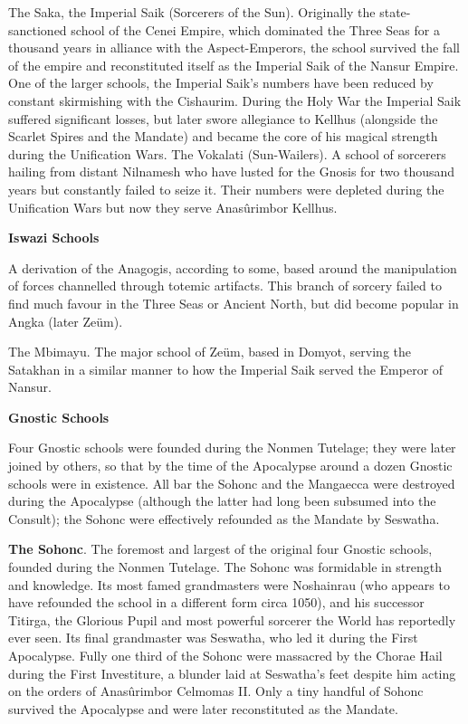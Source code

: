 \documentclass[]{book}
\begin{document}
The Saka, the Imperial Saik (Sorcerers of the Sun). Originally the state-sanctioned
school of the Cenei Empire, which dominated the Three Seas for a thousand years in
alliance with the Aspect-Emperors, the school survived the fall of the empire and
reconstituted itself as the Imperial Saik of the Nansur Empire. One of the larger
schools, the Imperial Saik's numbers have been reduced by constant skirmishing with
the Cishaurim. During the Holy War the Imperial Saik suffered significant losses, but
later swore allegiance to Kellhus (alongside the Scarlet Spires and the
Mandate) and
became the core of his magical strength during the Unification Wars.
The Vokalati (Sun-Wailers). A school of sorcerers hailing from distant Nilnamesh who
have lusted for the Gnosis for two thousand years but constantly failed to seize it. Their
numbers were depleted during the Unification Wars but now they serve Anasûrimbor
Kellhus.

\textbf{Iswazi Schools}

A derivation of the Anagogis, according to some, based around the manipulation of
forces channelled through totemic artifacts. This branch of sorcery failed to find much
favour in the Three Seas or Ancient North, but did become popular in Angka (later
Zeüm).

The Mbimayu. The major school of Zeüm, based in Domyot, serving the Satakhan in a
similar manner to how the Imperial Saik served the Emperor of Nansur.

\textbf{Gnostic Schools}

Four Gnostic schools were founded during the Nonmen Tutelage; they were later
joined by others, so that by the time of the Apocalypse around a dozen Gnostic schools
were in existence. All bar the Sohonc and the Mangaecca were destroyed during the
Apocalypse (although the latter had long been subsumed into the Consult); the Sohonc
were effectively refounded as the Mandate by Seswatha.

\textbf{The Sohonc}. The foremost and largest of the original four Gnostic schools, founded
during the Nonmen Tutelage. The Sohonc was formidable in strength and knowledge.
Its most famed grandmasters were Noshainrau (who appears to have refounded the
school in a different form circa 1050), and his successor Titirga, the Glorious Pupil and
most powerful sorcerer the World has reportedly ever seen. Its final grandmaster was
Seswatha, who led it during the First Apocalypse. Fully one third of the Sohonc were
massacred by the Chorae Hail during the First Investiture, a blunder laid at Seswatha's
feet despite him acting on the orders of Anasûrimbor Celmomas II. Only a tiny
handful of Sohonc survived the Apocalypse and were later reconstituted as the
Mandate.
\end{document}

